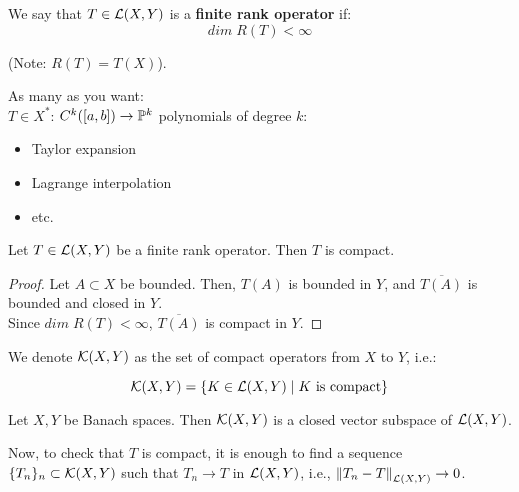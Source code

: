 \vspace{1em}

\begin{fdefinition}
    We say that $T \in \mathcal{L}(X, Y)$ is a \textbf{finite rank operator} if:
    $$ dim \; R(T) < \infty$$

    (Note: $R(T) = T(X)$).
\end{fdefinition}

\begin{example}
    As many as you want:\\

    $T \in X^*$: $C^k([a, b]) \to \mathbb{P}^k$ polynomials of degree $k$:
    \begin{itemize}
        \item Taylor expansion
        \item Lagrange interpolation
        \item etc.
    \end{itemize}
\end{example}

\begin{fproposition}
    Let $T \in \mathcal{L}(X, Y)$ be a finite rank operator. Then $T$ is compact.
\end{fproposition}

\begin{proof}
    Let $A \subset X$ be bounded. Then, $T(A)$ is bounded in $Y$, and $\overline{T(A)}$ is bounded
    and closed in $Y$.\\

    Since $dim \; R(T) < \infty$, $\overline{T(A)}$ is compact in $Y$.
\end{proof}

\begin{fdefinition}
    We denote $\mathcal{K}(X, Y)$ as the set of compact operators from $X$ to $Y$, i.e.:

    $$\mathcal{K}(X, Y) = \{K \in \mathcal{L}(X, Y) \; | \; K \text{ is compact}\}$$
\end{fdefinition}

\vspace{1em}

\begin{ftheorem}
    Let $X, Y$ be Banach spaces. Then $\mathcal{K}(X, Y)$ is a closed vector subspace of $\mathcal{L}(X, Y)$.
\end{ftheorem}

\begin{fremark}
    Now, to check that $T$ is compact, it is enough to find a sequence $\{T_n\}_n \subset \mathcal{K}(X, Y)$
    such that $T_n \to T$ in $\mathcal{L}(X, Y)$, i.e., $\left\|T_n - T\right\|_{\mathcal{L}(X, Y)} \to 0$.
\end{fremark}

